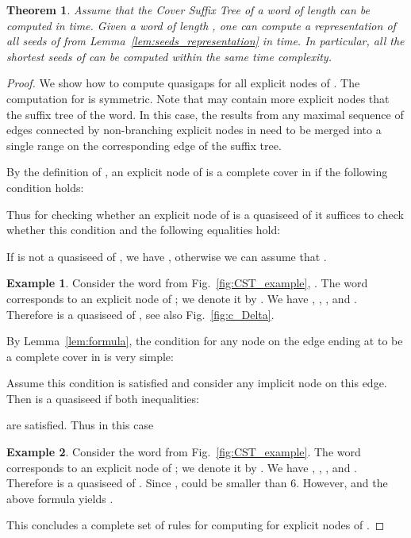 \documentclass{article}
\theoremstyle{theorem}
\newtheorem{theorem}{Theorem}
\theoremstyle{definition}
\newtheorem{example}{Example}
\begin{document}
  \begin{theorem}\label{thm:seeds}
    Assume that the Cover Suffix Tree of a word of length  can be computed in  time.
    Given a word  of length , one can compute a representation of all seeds of 
    from Lemma~\ref{lem:seeds_representation} in  time.
    In particular, all the shortest seeds of  can be computed within the same time complexity.
  \end{theorem}
  \begin{proof}
    We show how to compute quasigaps for all explicit nodes of .
    The computation for  is symmetric.
    Note that  may contain more explicit nodes that the suffix tree of the word.
    In this case, the results from any maximal sequence of edges connected by non-branching explicit nodes
    in  need to be merged into a single range on the corresponding edge of the suffix tree.

    By the definition of , an explicit node  of  is a complete cover in 
    if the following condition holds:
    
    Thus for checking whether an explicit node  of  is a quasiseed of 
    it suffices to check whether this condition and the following equalities hold:
    
    If  is not a quasiseed of , we have , otherwise
    we can assume that .

    \begin{example}
      Consider the word  from Fig.~\ref{fig:CST_example}, .
      The word  corresponds to an explicit node of ; we denote it by .
      We have , , , and .
      Therefore  is a quasiseed of , see also Fig.~\ref{fig:c_Delta}.
    \end{example}

    By Lemma~\ref{lem:formula}, the condition for any node on the edge ending at  to be
    a complete cover in  is very simple:
    
    Assume this condition is satisfied and consider any implicit node  on this edge.
    Then  is a quasiseed if both inequalities:
    
    are satisfied.
    Thus in this case
    
  
    \begin{example}
      Consider the word  from Fig.~\ref{fig:CST_example}.
      The word  corresponds to an explicit node of ; we denote it by .
      We have , , , and .
      Therefore  is a quasiseed of . 
      Since ,  could be smaller than 6.
      However,  and the above formula yields .
    \end{example}

    \noindent
    This concludes a complete set of rules for computing  for explicit nodes of .
  \end{proof}
\end{document}
